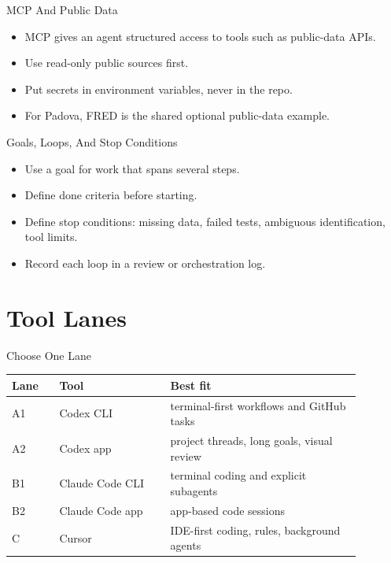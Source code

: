 \begin{frame}{MCP And Public Data}
  \begin{itemize}
    \item MCP gives an agent structured access to tools such as public-data APIs.
    \item Use read-only public sources first.
    \item Put secrets in environment variables, never in the repo.
    \item For Padova, FRED is the shared optional public-data example.
  \end{itemize}
\end{frame}

\begin{frame}{Goals, Loops, And Stop Conditions}
  \begin{itemize}
    \item Use a goal for work that spans several steps.
    \item Define done criteria before starting.
    \item Define stop conditions: missing data, failed tests, ambiguous identification, tool limits.
    \item Record each loop in a review or orchestration log.
  \end{itemize}
\end{frame}

\section{Tool Lanes}

\begin{frame}{Choose One Lane}
  \begin{tabular}{p{0.12\linewidth}p{0.28\linewidth}p{0.48\linewidth}}
    \toprule
    Lane & Tool & Best fit \\
    \midrule
    A1 & Codex CLI & terminal-first workflows and GitHub tasks \\
    A2 & Codex app & project threads, long goals, visual review \\
    B1 & Claude Code CLI & terminal coding and explicit subagents \\
    B2 & Claude Code app & app-based code sessions \\
    C & Cursor & IDE-first coding, rules, background agents \\
    \bottomrule
  \end{tabular}
  \vspace{0.5em}
\end{frame}

